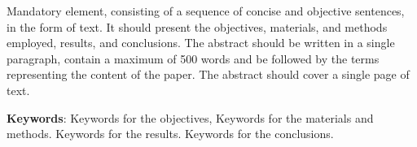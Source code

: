 
\noindent%
Mandatory element, consisting of a sequence of concise and objective sentences, in the form of text.
It should present the objectives, materials, and methods employed, results, and conclusions. The abstract should be written in a single paragraph, contain a maximum of 500 words and be followed by the terms representing the content of the paper. The abstract should cover a single page of text.
\vfill

\noindent \textbf {Keywords}: Keywords  for the objectives, Keywords  for the materials and methods. Keywords for the results. Keywords for the conclusions.